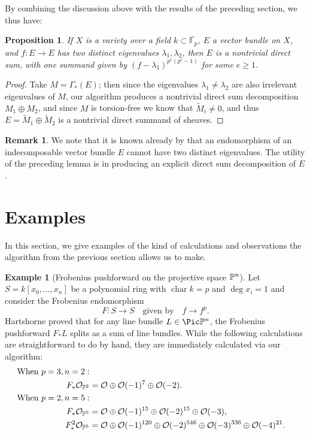 \documentclass[12pt]{article}
\let\l\lambda
\theoremstyle{theorem}
\numberwithin{thm}{section}
\newtheorem{prop}[thm]{Proposition}
\theoremstyle{definition}
\newtheorem{exa}[thm]{Example}
\newtheorem{rem}[thm]{Remark}
\begin{document}
By combining the discussion above with the results of the preceding section, we thus have:

\begin{prop}
If $X$ is a variety over a field $k\subset \overline{\mathbb F_{p}}$,
$E$ a vector bundle on $X$, and $f:E\to E$ has two distinct eigenvalues $\l_1,\l_2$, then $E$ is a nontrivial direct sum, with one summand given by $(f-\l_1)^{p^e(p^e-1)}$ for some $e\geq 1$.
\end{prop}

\begin{proof}
Take $M= \Gamma_*(E)$; then since the eigenvalues $\l_1\neq \l_2$ are also irrelevant eigenvalues of $M$, our algorithm produces a nontrivial direct sum decomposition $M_1\oplus M_2$, and since $M$ is torsion-free we know that $\widetilde M_i\neq 0$, and thus $E=\widetilde M_1\oplus \widetilde M_2$ is a nontrivial direct summand of sheaves.
\end{proof}

\begin{rem}
We note that it is known already by \cite[Proposition~15]{Atiyah57} that an endomorphism of an indecomposable vector bundle $E$ cannot have two distinct eigenvalues. The utility of the preceding lemma is in producing an explicit direct sum decomposition of $E$.
\end{rem}



\section{Examples}

In this section, we give examples of the kind of calculations and observations the algorithm from the previous section allows us to make.

\renewcommand{\char}{\operatorname{char}}

\begin{exa}[Frobenius pushforward on the projective space $\P^n$]
  Let $S = k[x_0,\dots,x_n]$ be a polynomial ring with $\char k = p$ and $\deg x_i = 1$ and consider the Frobenius endomorphism
  \[ F\colon S\to S \quad \text{given by} \quad f \to f^p. \]
  Hartshorne \cite{Hartshorne1970} proved that for any line bundle $L\in\Pic\P^n$, the Frobenius pushforward $F_*L$ splits as a sum of line bundles. While the following calculations are straightforward to do by hand, they are immediately calculated via our algorithm:
  \begin{align*}
    \text{When }p=3, n=2: \\
    F_*\O_{\P^2} &= \O \oplus \O(-1)^7 \oplus \O(-2). \\
    \text{When } p=2, n=5: \\
    F_*\O_{\P^5} &= \O \oplus \O(-1)^{15} \oplus \O(-2)^{15} \oplus \O(-3), \\
    F_*^2\O_{\P^5} &= \O \oplus \O(-1)^{120} \oplus \O(-2)^{546} \oplus \O(-3)^{336} \oplus \O(-4)^{21}.
  \end{align*}
\end{exa}
\end{document}
